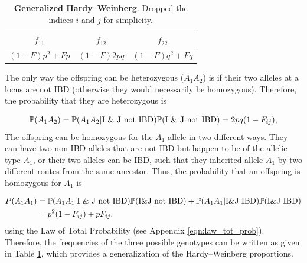 \begin{table}
\begin{center}
\begin{tabular}{ccc}
\hline
$f_{11}$ & $f_{12}$ & $f_{22}$ \\
\hline
$(1-F) p^2 + F p$ & $(1-F) 2pq$ & $(1-F) q^2 + F q$ \\
\hline
\end{tabular}
\end{center}
\caption{\textbf{Generalized Hardy--Weinberg}.  Dropped the indices $i$ and $j$ for simplicity. } \label{table:GeneralizedHWE}
\end{table}

The only way the offspring can be heterozygous ($A_1 A_2$) is if their two
alleles at a locus are not IBD (otherwise they would necessarily be
homozygous). Therefore, the probability that they are heterozygous is

\begin{equation}
\P(A_1 A_2) = \P(A_1 A_2 |\textrm{I \& J not IBD} ) \P (\textrm{I \& J not IBD} ) = 2p q (1-F_{ij}) ,
\label{eq:hetGenHW}
\end{equation}
%
 The offspring
can be homozygous for the $A_1$ allele in two different ways.  They can have
two non-IBD alleles that are not IBD but happen to be of the allelic type
$A_1$, or their two alleles can be IBD, such that they inherited allele $A_1$
by two different routes from the same ancestor. Thus, the probability that an
offspring is homozygous for $A_1$ is

\begin{align}
P(A_1 A_1) & = \P(A_1 A_1 |\textrm{I \& J not IBD} ) \P (\textrm{I\&J
  not IBD} ) + \P(A_1 A_1 |\textrm{I\&J IBD} ) \P (\textrm{I\&J IBD}) \nonumber\\
             &= p^2(1-F_{ij})  + pF_{ij}.
\end{align}
%
using the Law of Total Probability (see Appendix
\eqn \eqref{eqn:law_tot_prob}).  Therefore, the frequencies of the three possible genotypes can be written as given in
Table \ref{table:GeneralizedHWE}, which provides a generalization of the Hardy--Weinberg
proportions.\\



